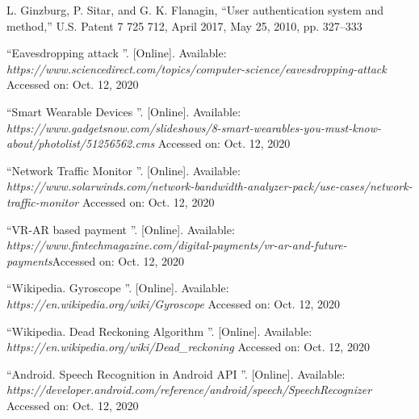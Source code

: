 \documentclass[12pt,a4paper,oneside]{report}
\begin{document}
\begin{thebibliography}{999}
 { L. Ginzburg, P. Sitar, and G. K. Flanagin, \textquotedblleft User authentication system
and method,”  U.S. Patent 7 725 712, April 2017, May 25, 2010,
pp. 327–333  }


 	 {{\textquotedblleft Eavesdropping attack \textquotedblright}. [Online]. Available:\\ \textit{https://www.sciencedirect.com/topics/computer-science/eavesdropping-attack} \newline Accessed on: Oct. 12, 2020}

 	 {{\textquotedblleft Smart Wearable Devices \textquotedblright}. [Online]. Available:\\ \textit{https://www.gadgetsnow.com/slideshows/8-smart-wearables-you-must-know-about/photolist/51256562.cms} Accessed on: Oct. 12, 2020}

 	 {{\textquotedblleft Network Traffic Monitor \textquotedblright}. [Online]. Available:\\ \textit{https://www.solarwinds.com/network-bandwidth-analyzer-pack/use-cases/network-traffic-monitor} Accessed on: Oct. 12, 2020}

 	 {{\textquotedblleft VR-AR based payment \textquotedblright}. [Online]. Available:\\ \textit{https://www.fintechmagazine.com/digital-payments/vr-ar-and-future-payments}\newline Accessed on: Oct. 12, 2020}

 	 {{\textquotedblleft Wikipedia. Gyroscope \textquotedblright}. [Online]. Available:\\ \textit{https://en.wikipedia.org/wiki/Gyroscope} Accessed on: Oct. 12, 2020}

 	 {{\textquotedblleft Wikipedia. Dead Reckoning Algorithm \textquotedblright}. [Online]. Available:\\ \textit{https://en.wikipedia.org/wiki/Dead_reckoning} Accessed on: Oct. 12, 2020}

 	 {{\textquotedblleft Android. Speech Recognition in Android API \textquotedblright}. [Online]. Available:\\ \textit{https://developer.android.com/reference/android/speech/SpeechRecognizer} Accessed on: Oct. 12, 2020}


\end{thebibliography}
\end{document}
